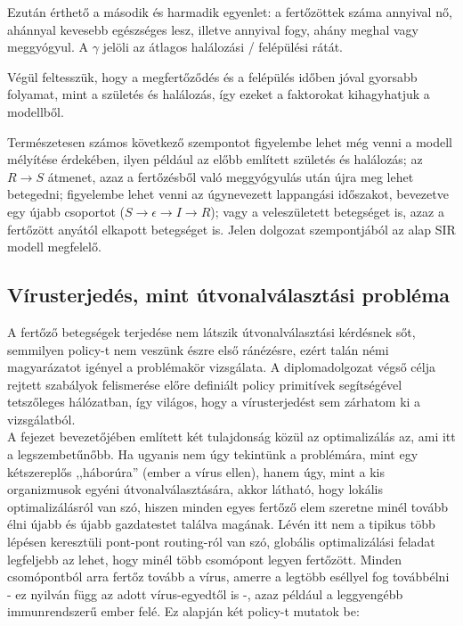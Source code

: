     Ezután érthető a második és harmadik egyenlet: a fertőzöttek száma annyival nő, ahánnyal kevesebb egészséges lesz, illetve annyival fogy, ahány meghal vagy meggyógyul. A $\gamma$ jelöli az átlagos halálozási / felépülési rátát.

    Végül feltesszük, hogy a megfertőződés és a felépülés időben jóval gyorsabb folyamat, mint a születés és halálozás, így ezeket a faktorokat kihagyhatjuk a modellből.

    \begin{note}
      Természetesen számos következő szempontot figyelembe lehet még venni a modell mélyítése érdekében, ilyen például az előbb említett születés és halálozás; az $R \rightarrow S$ átmenet, azaz a fertőzésből való meggyógyulás után újra meg lehet betegedni; figyelembe lehet venni az úgynevezett lappangási időszakot, bevezetve egy újabb csoportot ($S \rightarrow \epsilon \rightarrow I \rightarrow R$); vagy a veleszületett betegséget is, azaz a fertőzött anyától elkapott betegséget is.\newline
      Jelen dolgozat szempontjából az alap SIR modell megfelelő.
    \end{note}

    \subsection{Vírusterjedés, mint útvonalválasztási probléma}

    A fertőző betegségek terjedése nem látszik útvonalválasztási kérdésnek sőt, semmilyen policy-t nem veszünk észre első ránézésre, ezért talán némi magyarázatot igényel a problémakör vizsgálata. A diplomadolgozat végső célja rejtett szabályok felismerése előre definiált policy primitívek segítségével tetszőleges hálózatban, így világos, hogy a vírusterjedést sem zárhatom ki a vizsgálatból.\\

    A fejezet bevezetőjében említett két tulajdonság közül az optimalizálás az, ami itt a legszembetűnőbb. Ha ugyanis nem úgy tekintünk a problémára, mint egy kétszereplős ,,háborúra'' (ember a vírus ellen), hanem úgy, mint a kis organizmusok egyéni útvonalválasztására, akkor látható, hogy lokális optimalizálásról van szó, hiszen minden egyes fertőző elem szeretne minél tovább élni újabb és újabb gazdatestet találva magának. Lévén itt nem a tipikus több lépésen keresztüli pont-pont routing-ról van szó, globális optimalizálási feladat legfeljebb az lehet, hogy minél több csomópont legyen fertőzött. Minden csomópontból arra fertőz tovább a vírus, amerre a legtöbb eséllyel fog továbbélni - ez nyilván függ az adott vírus-egyedtől is -, azaz például a leggyengébb immunrendszerű ember felé. Ez alapján két policy-t mutatok be:

